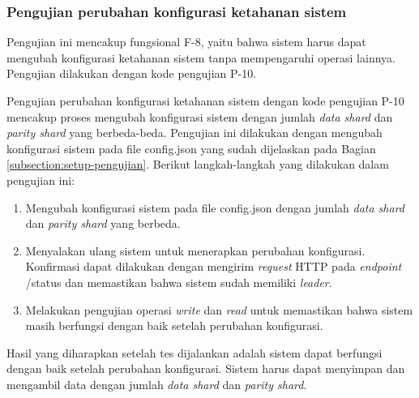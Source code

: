 \subsubsection{Pengujian perubahan konfigurasi ketahanan sistem}
\label{subsubsection:pengujian-perubahan-konfigurasi-ketahanan}

Pengujian ini mencakup fungsional F-8, yaitu bahwa sistem harus dapat mengubah konfigurasi ketahanan sistem tanpa mempengaruhi operasi lainnya. Pengujian dilakukan dengan kode pengujian P-10.

Pengujian perubahan konfigurasi ketahanan sistem dengan kode pengujian P-10 mencakup proses mengubah konfigurasi sistem dengan jumlah \textit{data shard} dan \textit{parity shard} yang berbeda-beda. Pengujian ini dilakukan dengan mengubah konfigurasi sistem pada file config.json yang sudah dijelaskan pada Bagian \ref{subsection:setup-pengujian}. Berikut langkah-langkah yang dilakukan dalam pengujian ini:

\begin{enumerate}
	\item Mengubah konfigurasi sistem pada file config.json dengan jumlah \textit{data shard} dan \textit{parity shard} yang berbeda.
	\item Menyalakan ulang sistem untuk menerapkan perubahan konfigurasi. Konfirmasi dapat dilakukan dengan mengirim \textit{request} HTTP pada \textit{endpoint} /status dan memastikan bahwa sistem sudah memiliki \textit{leader}.
	\item Melakukan pengujian operasi \textit{write} dan \textit{read} untuk memastikan bahwa sistem masih berfungsi dengan baik setelah perubahan konfigurasi.
\end{enumerate}

Hasil yang diharapkan setelah tes dijalankan adalah sistem dapat berfungsi dengan baik setelah perubahan konfigurasi. Sistem harus dapat menyimpan dan mengambil data dengan jumlah \textit{data shard} dan \textit{parity shard}.